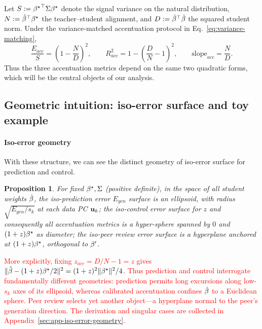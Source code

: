 \documentclass{article}
\newcommand{\red}[1]{\textcolor{red}{#1}}
\providecommand{\propositionname}{Proposition}
\theoremstyle{plain}
\newtheorem{prop}[thm]{\propositionname}
\theoremstyle{definition}
\theoremstyle{remark}
\begin{document}
{
Let $S:={{\beta^{\star}}}^{\top}\Sigma{\beta^{\star}}$ denote the signal variance on the natural distribution, 
$N:={\hat{\beta}}^{\top}{\beta^{\star}}$ the teacher--student alignment, and $D:={\hat{\beta}}^{\top}\hat{\beta}$ the squared student norm. Under the variance-matched accentuation protocol in Eq.~\ref{eq:variance-matching},
\begin{equation}
\frac{E_{acc}}{S}=\left(1-\frac{N}{D}\right)^2,
\qquad
R_{acc}^2=1-\left(\frac{D}{N}-1\right)^2,
\qquad
\mathrm{slope}_{acc}=\frac{N}{D}.
\label{eq:acc_metric_ND_depen}
\end{equation}
Thus the three accentuation metrics depend on the same two quadratic forms, which will be the central objects of our analysis. 
}

\subsection{Geometric intuition: iso-error surface and toy example}
\label{sec:linear-geometry}
\paragraph{Iso-error geometry}
With these structure, we can see the distinct geometry of iso-error surface for prediction and control. 
\begin{prop}
For fixed ${\beta^{\star}},\Sigma$ (positive definite), in the space of all student weights $\hat{\beta}$, 
the iso-prediction error $E_{gen}$ surface is an ellipsoid, with radius $\sqrt{E_{gen}/s_k}$ at each data PC ${\mathbf{u}}_k$; 
the iso-control error surface for $z$ and consequently all accentuation metrics is a hyper-sphere spanned by $0$ and $(1+z){\beta^{\star}}$ as diameter; 
the iso-peer review error surface is a hyperplane anchored at $(1+z){\beta^{\star}}$, orthogonal to ${\beta^{\prime}}$. 
\end{prop}
\red{More explicitly, fixing $z_{acc}=D/N-1=z$ gives
$\|\hat{\beta}-(1+z){\beta^{\star}}/2\|^2=(1+z)^2\|{\beta^{\star}}\|^2/4$.
Thus prediction and control interrogate fundamentally different geometries:
prediction permits long excursions along low-$s_k$ axes of its ellipsoid,
whereas calibrated accentuation confines $\hat{\beta}$ to a Euclidean sphere.
Peer review selects yet another object---a hyperplane normal to the peer's
generation direction.  The derivation and singular cases are collected in
Appendix~\ref{sec:app-iso-error-geometry}.}
\end{document}

